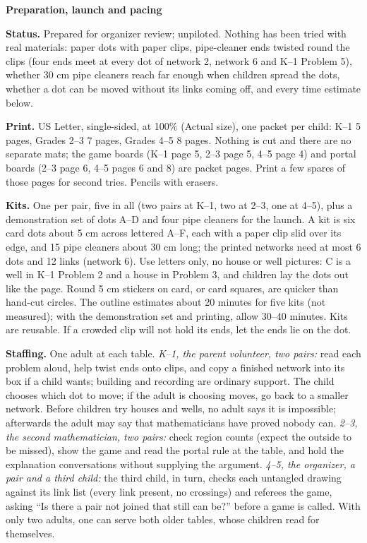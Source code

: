 \documentclass[11pt]{article}
\newcommand{\head}[1]{\par\needspace{5\baselineskip}\textbf{\large #1}\par\nopagebreak}
\begin{document}
\head{Preparation, launch and pacing}
\textbf{Status.} Prepared for organizer review; unpiloted. Nothing has been tried with real materials: paper dots with paper clips, pipe-cleaner ends twisted round the clips (four ends meet at every dot of network 2, network 6 and K--1 Problem 5), whether 30 cm pipe cleaners reach far enough when children spread the dots, whether a dot can be moved without its links coming off, and every time estimate below.

\textbf{Print.} US Letter, single-sided, at 100\% (Actual size), one packet per child: K--1 5 pages, Grades 2--3 7 pages, Grades 4--5 8 pages. Nothing is cut and there are no separate mats; the game boards (K--1 page 5, 2--3 page 5, 4--5 page 4) and portal boards (2--3 page 6, 4--5 pages 6 and 8) are packet pages. Print a few spares of those pages for second tries. Pencils with erasers.

\textbf{Kits.} One per pair, five in all (two pairs at K--1, two at 2--3, one at 4--5), plus a demonstration set of dots A--D and four pipe cleaners for the launch. A kit is six card dots about 5 cm across lettered A--F, each with a paper clip slid over its edge, and 15 pipe cleaners about 30 cm long; the printed networks need at most 6 dots and 12 links (network 6). Use letters only, no house or well pictures: C is a well in K--1 Problem 2 and a house in Problem 3, and children lay the dots out like the page. Round 5 cm stickers on card, or card squares, are quicker than hand-cut circles. The outline estimates about 20 minutes for five kits (not measured); with the demonstration set and printing, allow 30--40 minutes. Kits are reusable. If a crowded clip will not hold its ends, let the ends lie on the dot.

\textbf{Staffing.} One adult at each table. \emph{K--1, the parent volunteer, two pairs:} read each problem aloud, help twist ends onto clips, and copy a finished network into its box if a child wants; building and recording are ordinary support. The child chooses which dot to move; if the adult is choosing moves, go back to a smaller network. Before children try houses and wells, no adult says it is impossible; afterwards the adult may say that mathematicians have proved nobody can. \emph{2--3, the second mathematician, two pairs:} check region counts (expect the outside to be missed), show the game and read the portal rule at the table, and hold the explanation conversations without supplying the argument. \emph{4--5, the organizer, a pair and a third child:} the third child, in turn, checks each untangled drawing against its link list (every link present, no crossings) and referees the game, asking ``Is there a pair not joined that still can be?'' before a game is called. With only two adults, one can serve both older tables, whose children read for themselves.
\end{document}
